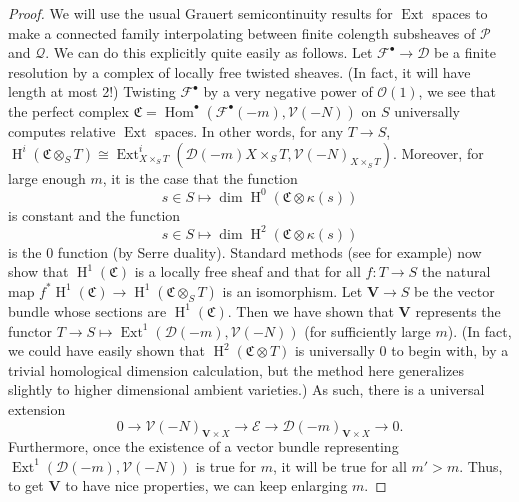 \documentclass[11pt]{amsart}
\newcommand{\mf}[1]{\mathfrak #1}
\newcommand{\ms}[1]{\mathscr #1}
\renewcommand{\hom}{\operatorname{Hom}}
\renewcommand{\H}{\operatorname{H}}
\DeclareMathOperator{\ext}{\operatorname{Ext}}
\renewcommand{\[}{[\!\hspace{0.03em}[}
\renewcommand{\]}{]\!\hspace{0.03em}]}
\renewcommand{\(}{(\!\hspace{0.03em}(}
\renewcommand{\)}{)\!\hspace{0.03em})}
\DeclareMathOperator*{\tensor}{\otimes}
\theoremstyle{definition}
\theoremstyle{remark}
\begin{document}
\begin{proof}
We will use the usual Grauert semicontinuity results for $\ext$ 
spaces to make a connected family interpolating between finite colength 
subsheaves of $\ms P$ and $\ms Q$.  We can do this explicitly quite 
easily as follows.  
Let $\ms F^{\bullet}\to\ms D$ be a finite resolution by a complex of locally 
free twisted sheaves.  (In fact, it will have length at most 2!)  
Twisting $\ms F^{\bullet}$ by a very negative power of ${\ms O}(1)$, we see that 
the perfect complex $\mf C=\hom^{\bullet}(\ms F^{\bullet}(-m),\ms V(-N))$ on $S$ 
universally computes relative $\ext$ spaces.  In other words, for any 
$T\to S$, $\H^{i}(\mf C\tensor_{S}T)\cong\ext^{i}_{X\times_{S}T}(\ms 
D(-m){X\times_{S} T},\ms V(-N)_{X\times_{S} T})$.  Moreover, for large 
enough $m$, it is the case that the function $$s\in S\mapsto\dim\H^{0}(\mf 
C\tensor\kappa(s))$$ is constant and the function $$s\in 
S\mapsto\dim\H^{2}(\mf C\tensor\kappa(s))$$
is the 0 function (by Serre duality).  Standard methods (see 
\cite[III.12]{hartshorne} for example) now show that $\H^{1}(\mf C)$ is a locally 
free sheaf and that for all $f:T\to S$ the natural map 
$f^{\ast}\H^{1}(\mf C)\to\H^{1}(\mf C\tensor_{S}T)$ is an 
isomorphism.  Let $\mathbf V\to S$ be the vector bundle whose sections 
are $\H^{1}(\mf C)$.  Then we have shown that $\mathbf V$ represents 
the functor $T\to S\mapsto\ext^{1}(\ms D(-m),\ms V(-N))$ (for 
sufficiently large $m$).  (In fact, we could have easily shown that 
$\H^{2}(\mf C\tensor T)$ is universally 0 to begin with, by a trivial 
homological dimension calculation, but the method here generalizes 
slightly to higher dimensional ambient varieties.) 
As such, there is a universal extension
$$0\to\ms V(-N)_{\mathbf V\times X}\to\ms E\to\ms D(-m)_{\mathbf 
V\times X}\to 0.$$  Furthermore, once the existence of a vector bundle 
representing $\ext^{1}(\ms D(-m),\ms V(-N))$ is true for $m$, it will be 
true for all $m'>m$.  Thus, to get $\mathbf V$ to have nice 
properties, we can keep enlarging $m$.  


\end{proof}
\end{document}
